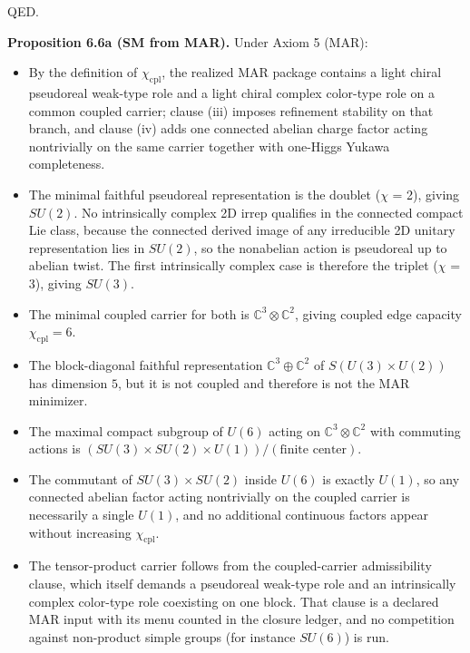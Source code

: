 QED.

\textbf{Proposition 6.6a (SM from MAR).} Under Axiom 5 (MAR):

\begin{itemize}
\tightlist
\item
  By the definition of \(\chi_{\mathrm{cpl}}\), the realized MAR package contains a light chiral pseudoreal weak-type role and a light chiral complex color-type role on a common coupled carrier; clause (iii) imposes refinement stability on that branch, and clause (iv) adds one connected abelian charge factor acting nontrivially on the same carrier together with one-Higgs Yukawa completeness.
\item
  The minimal faithful pseudoreal representation is the doublet (\ensuremath{\chi} = 2), giving \(SU(2)\). No intrinsically complex 2D irrep qualifies in the connected compact Lie class, because the connected derived image of any irreducible 2D unitary representation lies in \(SU(2)\), so the nonabelian action is pseudoreal up to abelian twist. The first intrinsically complex case is therefore the triplet (\ensuremath{\chi} = 3), giving \(SU(3)\).
\item
  The minimal coupled carrier for both is \(\mathbb{C}^3 \otimes \mathbb{C}^2\), giving coupled edge capacity \(\chi_{\mathrm{cpl}} = 6\).
\item
  The block-diagonal faithful representation \(\mathbb{C}^3 \oplus \mathbb{C}^2\) of \(S(U(3)\times U(2))\) has dimension \(5\), but it is not coupled and therefore is not the MAR minimizer.
\item
  The maximal compact subgroup of \(U(6)\) acting on \(\mathbb{C}^3 \otimes \mathbb{C}^2\) with commuting actions is \((SU(3) \times SU(2) \times U(1))/(\text{finite center})\).
\item
  The commutant of \(SU(3) \times SU(2)\) inside \(U(6)\) is exactly \(U(1)\), so any connected abelian factor acting nontrivially on the coupled carrier is necessarily a single \(U(1)\), and no additional continuous factors appear without increasing \(\chi_{\mathrm{cpl}}\).
\item
  The tensor-product carrier follows from the coupled-carrier admissibility clause, which itself demands a pseudoreal weak-type role and an intrinsically complex color-type role coexisting on one block. That clause is a declared MAR input with its menu counted in the closure ledger, and no competition against non-product simple groups (for instance \(SU(6)\)) is run.
\end{itemize}

